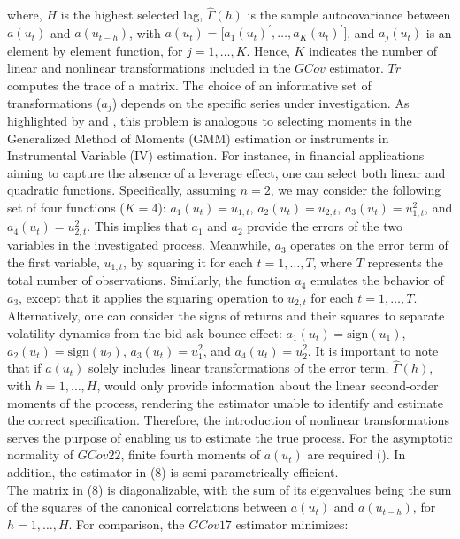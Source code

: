 \documentclass[<1p>]{elsarticle} %
\begin{document}
where, $H$ is the highest selected lag, $\hat{\Gamma}(h)$ is the sample autocovariance between $a(u_t)$ and $a(u_{t-h})$, with $a(u_t)= \bigl[ a_1(u_{t})^{\prime}, \dots , a_K(u_t)^{\prime}\bigr]$, and $a_j(u_t)$ is an element by element function, for $j=1, \dots , K$. Hence, $K$ indicates the number of linear and nonlinear transformations included in the $GCov$ estimator. $Tr$ computes the trace of a matrix. The choice of an informative set of transformations ($a_{j}$) depends on the specific series under investigation. As highlighted by \cite{gourieroux2017noncausal} and \cite{gourieroux2022generalized}, this problem is analogous to selecting moments in the Generalized Method of Moments (GMM) estimation or instruments in Instrumental Variable (IV) estimation. For instance, in financial applications aiming to capture the absence of a leverage effect, one can select both linear and quadratic functions. Specifically, assuming $n=2$, we may consider the following set of four functions ($K=4$): $a_1(u_t) = u_{1,t}$, $a_2(u_t) = u_{2,t}$, $a_3(u_t) = u_{1,t}^2$, and $a_4(u_t) = u_{2,t}^2$. This implies that $a_1$ and $a_2$ provide the errors of the two variables in the investigated process. Meanwhile, $a_3$ operates on the error term of the first variable, $u_{1,t}$, by squaring it for each $t=1, \dots, T$, where $T$ represents the total number of observations. Similarly, the function $a_4$ emulates the behavior of $a_3$, except that it applies the squaring operation to $u_{2,t}$ for each $t=1, \dots, T$. Alternatively, one can consider the signs of returns and their squares to separate volatility dynamics from the bid-ask bounce effect: \(a_1(u_t) = \text{sign}(u_1)\), \(a_2(u_t) = \text{sign}(u_2)\), \(a_3(u_t) = u_1^2\), and \(a_4(u_t) = u_2^2\). It is important to note that if $a(u_t)$ solely includes linear transformations of the error term, $\hat{\Gamma}(h)$, with $h=1, \dots, H$, would only provide information about the linear second-order moments of the process, rendering the estimator unable to identify and estimate the correct specification. Therefore, the introduction of nonlinear transformations serves the purpose of enabling us to estimate the true process. For the asymptotic normality of $GCov22$, finite fourth moments of $a(u_t)$ are required (\cite{gourieroux2022generalized}). In addition, the estimator in (8) is semi-parametrically efficient.\\
\indent The matrix in (8) is diagonalizable, with the sum of its eigenvalues being the sum of the squares of the canonical correlations between $a(u_{t})$ and $a(u_{t-h})$, for $h=1, \dots, H$. For comparison, the $GCov17$ estimator minimizes:
\end{document}
